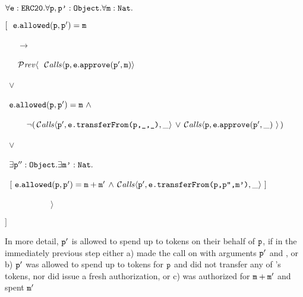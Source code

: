  
\vspace{.15cm}
\noindent
 $\forall {\mbox{\tt{e}}}:{\mbox{\tt{ERC20}}}.\forall {\mbox{\tt{p}}},{\mbox{\tt{p'}}}:{\mbox{\tt{Object}}}.\forall {\mbox{\tt{m}}}:{\mbox{\tt{Nat}}}.$\\
\strut \hspace{0.3cm} $[\ \ \prg{e}.\prg{allowed}(\prg{p},\prg{p}')=\prg{m} $\\
\strut \hspace{0.4cm} \ \ \ $\longrightarrow$\\
\strut \hspace{0.4cm} \ \ \  
     $\PrevId\langle\ \  \Calls{\prg{p},\prg{e}.\prg{approve}(\prg{p}',\prg{m})} $\\
      \strut \hspace{1.7cm} \ $\vee $\\
\strut \hspace{1.7cm} \  
     $    {\mbox{\tt{e}}}.{\mbox{\tt{allowed}}}({\mbox{\tt{p}}},{\mbox{\tt{p}}}')={\mbox{\tt{m}}}   
        \  \wedge\ $\\
\strut \hspace{1.5cm} \ \ \ \ \          $  \neg   (\, {\mathcal{C}}\textrm{\textit{alls}}\langle {\mbox{\tt{p}}}',{\mbox{\tt{e.transferFrom(p,\_,\_)}}},\_ \rangle\, \vee \, {\mathcal{C}}\textrm{\textit{alls}}\langle {\mbox{\tt{p}}},{\mbox{\tt{e}}}.{\mbox{\tt{approve}}}({\mbox{\tt{p}}}',\_)\ \rangle\, ) $\\
      \strut \hspace{1.7cm}\  $\vee $\\
\strut \hspace{1.7cm}   \  $ \exists {\mbox{\tt{p}}}'':{\mbox{\tt{Object}}}.\exists{\mbox{\tt{m'}}}:{\mbox{\tt{Nat}}}.$\\
 \strut \hspace{1.7cm}\  $[\   
  {\mbox{\tt{e}}}.{\mbox{\tt{allowed}}}({\mbox{\tt{p}}},{\mbox{\tt{p}}}')={\mbox{\tt{m}}}+{\mbox{\tt{m}}}'  \, \wedge\,   {\mathcal{C}}\textrm{\textit{alls}}\langle {\mbox{\tt{p}}}',{\mbox{\tt{e.transferFrom(p,p'',{\mbox{\tt{m}}}')}}},\_ \rangle\  ]$\\
\strut \hspace{0.4cm} \ \ \  \ \ \  \ \ \ \ \ $\rangle $\\
\strut \hspace{0.3cm} $]$
\vspace{.15cm}
 
In more detail, $'$ is allowed to spend 
up to  tokens on their behalf of ${\mbox{\tt{p}}}$, if in the immediately previous step either a)
  made the call  on  
with arguments $'$ and \prg{m}, or b)  
${\mbox{\tt{p}}}'$ was allowed to spend  up to \prg{m} tokens for ${\mbox{\tt{p}}}$
and did not transfer any of \prg{p}'s tokens, nor did \prg{p} issue a fresh authorization,
or c) \prg{p} was authorized for ${\mbox{\tt{m}}}+{\mbox{\tt{m}}}'$ and spent ${\mbox{\tt{m}}}'$ 
  
